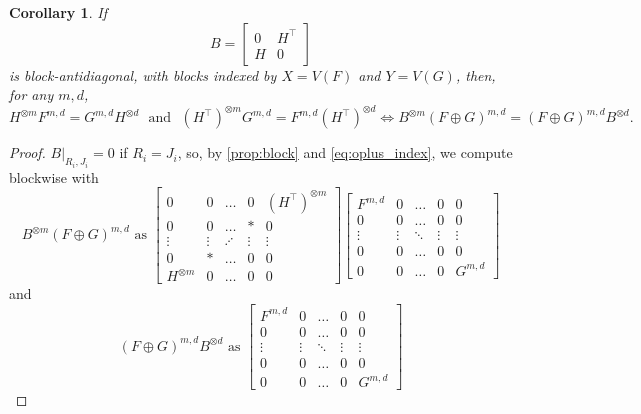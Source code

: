 \documentclass{article}
\newtheorem{corollary}{Corollary}[section]
\theoremstyle{remark}
\theoremstyle{definition}
\begin{document}
\begin{corollary}
\label{cor:off_diag_block}
If
\[
    B = \begin{bmatrix} 0 & H^\top \\ H & 0 \end{bmatrix}
\]
is block-antidiagonal, with blocks indexed by $X = V(F)$ and $Y = V(G)$, then, for any $m,d$,
\[
    H^{\otimes m}F^{m,d} = G^{m,d}H^{\otimes d} \text{~~and~~}
    (H^\top)^{\otimes m}G^{m,d} = F^{m,d}(H^\top)^{\otimes d}
    \iff 
    B^{\otimes m}(F \oplus G)^{m,d} = (F \oplus G)^{m,d}B^{\otimes d}.
\]
\end{corollary}
\begin{proof}
    $B|_{R_i,J_i} = 0$ if $R_i = J_i$, so, by \autoref{prop:block} and \eqref{eq:oplus_index}, 
    we compute blockwise with
    \begin{equation}
        B^{\otimes m}(F \oplus G)^{m,d} \text{ as }
        \begin{bmatrix} 
            0 & 0 & \ldots & 0 & (H^\top)^{\otimes m}\\
            0 & 0 & \ldots & * & 0\\
            \vdots & \vdots & \iddots & \vdots & \vdots \\
            0 & * & \ldots & 0 & 0\\
            H^{\otimes m} & 0 & \ldots & 0 & 0
        \end{bmatrix}
        \begin{bmatrix} 
            F^{m,d} & 0 & \ldots & 0 & 0\\
            0 & 0 &\ldots & 0 & 0\\
            \vdots & \vdots & \ddots & \vdots & \vdots\\
            0 & 0 &\ldots & 0 & 0\\
            0 & 0 & \ldots & 0 & G^{m,d}
        \end{bmatrix}
        \label{eq:hmkmd}
    \end{equation}
    and
    \begin{equation}
        (F \oplus G)^{m,d} B^{\otimes d} \text{ as }
        \begin{bmatrix} 
            F^{m,d} & 0 & \ldots & 0 & 0\\
            0 & 0 &\ldots & 0 & 0\\
            \vdots & \vdots & \ddots & \vdots & \vdots\\
            0 & 0 &\ldots & 0 & 0\\
            0 & 0 & \ldots & 0 & G^{m,d}
        \end{bmatrix}

\end{equation}
\end{proof}
\end{document}
